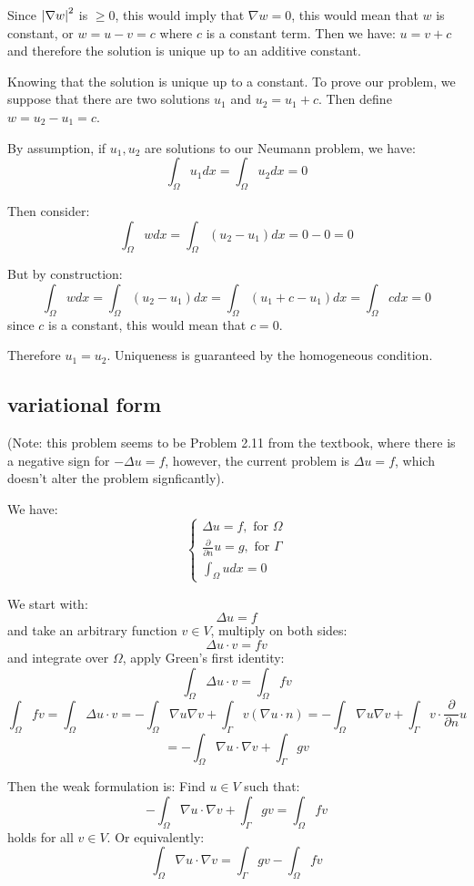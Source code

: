 \documentclass[12pt]{article} %
\newcommand{\pdx}[1]{\frac{\partial}{\partial {#1}}}
\newcommand{\1}[1]{\mathds{1}\left[#1\right]}
\begin{document}
Since $\abs{\nabla w}^{2}$ is $\ge 0$, this would imply that $\nabla w = 0$, this would mean that $w$ is constant, or $w = u - v = c$ where $c$ is a constant term. Then we have: $u = v + c$ and therefore the solution is unique up to an additive constant.

Knowing that the solution is unique up to a constant. To prove our problem, we suppose that there are two solutions $u_1$ and $u_2 = u_1 + c$. Then define $w = u_2 - u_1 = c$.

By assumption, if $u_1, u_2$ are solutions to our Neumann problem, we have:
$$
	\int_{\Omega}u_1 dx = \int_{\Omega}u_2 dx = 0
$$

Then consider:
$$
	\int_{\Omega}w dx = \int_{\Omega}(u_2 - u_1)dx = 0 - 0 = 0
$$

But by construction:
$$
	\int_{\Omega}wdx = \int_{\Omega}(u_2 - u_1)dx = \int_{\Omega}(u_1 + c - u_1)dx = \int_{\Omega} cdx = 0
$$ since $c$ is a constant, this would mean that $c = 0$.

Therefore $u_1 = u_2$. Uniqueness is guaranteed by the homogeneous condition.

\subsection{variational form}
(Note: this problem seems to be Problem 2.11 from the textbook, where there is a negative sign for $-\Delta u = f$, however, the current problem is $\Delta u = f$, which doesn't alter the problem signficantly).

We have:
$$
	\begin{cases}
		\Delta u = f, \text{ for $\Omega$} \\
		\pdx{n}u = g, \text{ for $\Gamma$}\\
		\int_{\Omega}udx = 0
	\end{cases}
$$

We start with:
$$
	\Delta u = f
$$ and take an arbitrary function $v \in V$, multiply on both sides:
$$
	\Delta u\cdot v = fv
$$ and integrate over $\Omega$, apply Green's first identity:
$$
	\int_{\Omega}\Delta u\cdot v = \int_{\Omega}fv
$$
$$
	\int_{\Omega}fv = \int_{\Omega}\Delta u \cdot v = -\int_{\Omega}\nabla u \nabla v + \int_{\Gamma}v(\nabla u \cdot n) = -\int_{\Omega}\nabla u\nabla v +\int_{\Gamma}v\cdot\pdx{n}u
$$
$$
	= -\int_{\Omega}\nabla u\cdot\nabla v + \int_{\Gamma}gv
$$

Then the weak formulation is:
Find $u \in V$ such that:
$$
	-\int_{\Omega}\nabla u\cdot\nabla v + \int_{\Gamma}gv = \int_{\Omega}fv
$$ holds for all $v\in V$. Or equivalently:
$$
	\int_{\Omega}\nabla u\cdot\nabla v = \int_{\Gamma}gv - \int_{\Omega}fv
$$
\end{document}
